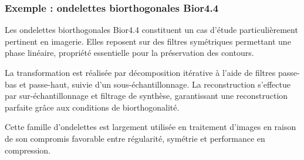 \subsubsection{Exemple : ondelettes biorthogonales Bior4.4}

Les ondelettes biorthogonales Bior4.4 constituent un cas d'étude particulièrement pertinent en imagerie. Elles reposent sur des filtres symétriques permettant une phase linéaire, propriété essentielle pour la préservation des contours.

La transformation est réalisée par décomposition itérative à l'aide de filtres passe-bas et passe-haut, suivie d'un sous-échantillonnage. La reconstruction s'effectue par sur-échantillonnage et filtrage de synthèse, garantissant une reconstruction parfaite grâce aux conditions de biorthogonalité.

Cette famille d'ondelettes est largement utilisée en traitement d'images en raison de son compromis favorable entre régularité, symétrie et performance en compression.

